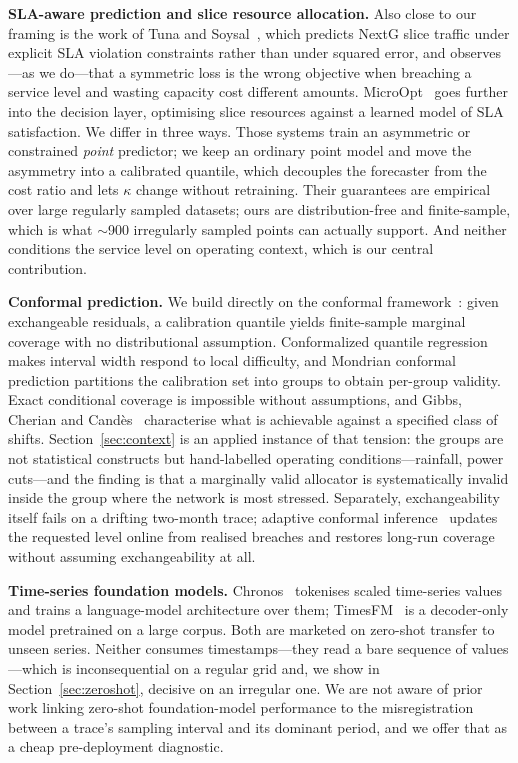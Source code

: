 \documentclass[conference]{IEEEtran}
\begin{document}
\textbf{SLA-aware prediction and slice resource allocation.} Also close to our framing
is
the work of Tuna and Soysal~\cite{tuna2023multivariate,tuna2023spatiotemporal}, which
predicts NextG slice traffic under explicit SLA violation constraints rather than under
squared error, and observes---as we do---that a symmetric loss is the wrong objective
when breaching a service level and wasting capacity cost different amounts.
MicroOpt~\cite{sulaiman2024microopt} goes further into the decision layer, optimising
slice resources against a learned model of SLA satisfaction. We differ in three ways.
Those systems train an asymmetric or constrained \emph{point} predictor; we keep an
ordinary point model and move the asymmetry into a calibrated quantile, which decouples
the forecaster from the cost ratio and lets $\kappa$ change without retraining. Their
guarantees are empirical over large regularly sampled datasets; ours are
distribution-free and finite-sample, which is what $\sim$900 irregularly sampled points
can actually support. And neither conditions the service level on operating context,
which is our central contribution.

\textbf{Conformal prediction.} We build directly on the conformal
framework~\cite{vovk2005algorithmic,angelopoulos2024foundations}: given exchangeable
residuals, a calibration quantile yields finite-sample marginal coverage with no
distributional assumption. Conformalized quantile regression~\cite{romano2019cqr} makes
interval width respond to local difficulty, and Mondrian conformal prediction
partitions the calibration set into groups to obtain per-group validity. Exact
conditional coverage is impossible without assumptions, and Gibbs, Cherian and
Cand\`{e}s~\cite{gibbs2023conditional} characterise what is achievable against a
specified class of shifts. Section~\ref{sec:context} is an applied instance of that
tension: the groups are not statistical constructs but hand-labelled operating
conditions---rainfall, power cuts---and the finding is that a marginally valid
allocator is systematically invalid inside the group where the network is most
stressed. Separately, exchangeability itself fails on a drifting two-month trace;
adaptive conformal inference~\cite{gibbs2021adaptive} updates the requested level
online from realised breaches and restores long-run coverage without assuming
exchangeability at all.

\textbf{Time-series foundation models.} Chronos~\cite{ansari2024chronos} tokenises
scaled time-series values and trains a language-model architecture over them;
TimesFM~\cite{das2023decoder} is a decoder-only model pretrained on a large corpus.
Both are marketed on zero-shot transfer to unseen series. Neither consumes
timestamps---they read a bare sequence of values---which is inconsequential on a
regular grid and, we show in Section~\ref{sec:zeroshot}, decisive on an irregular one.
We are not aware of prior work linking zero-shot foundation-model performance to the
misregistration between a trace's sampling interval and its dominant period, and we
offer that as a cheap pre-deployment diagnostic.
\end{document}
